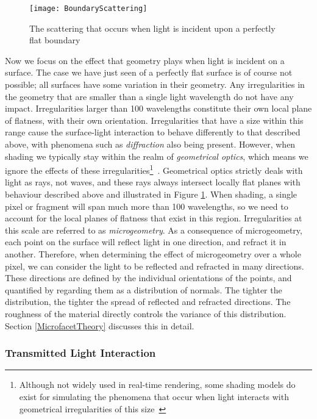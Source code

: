 \begin{figure}[h]
	\centering
	\texttt{[image: BoundaryScattering]}
	\caption{The scattering that occurs when light is incident upon a perfectly flat boundary}
	\label{fig:BoundaryScattering}
\end{figure}

Now we focus on the effect that geometry plays when light is incident on a surface. The case we have just seen of a perfectly flat surface is of course not possible; all surfaces have some variation in their geometry. Any irregularities in the geometry that are smaller than a single light wavelength do not have any impact. Irregularities larger than 100 wavelengths constitute their own local plane of flatness, with their own orientation. Irregularities that have a size within this range cause the surface-light interaction to behave differently to that described above, with phenomena such as \textit{diffraction} also being present. However, when shading we typically stay within the realm of \textit{geometrical optics}, which means we ignore the effects of these irregularities\footnote{Although not widely used in real-time rendering, some shading models do exist for simulating the phenomena that occur when light interacts with geometrical irregularities of this size~\cite{ReflectionAndDiffractionModel}}~\cite{DiffuseSpecularAtSurfaces}. Geometrical optics strictly deals with light as rays, not waves, and these rays always intersect locally flat planes with behaviour described above and illustrated in Figure \ref{fig:BoundaryScattering}. When shading, a single pixel or fragment will span much more than 100 wavelengths, so we need to account for the local planes of flatness that exist in this region. Irregularities at this scale are referred to as \textit{microgeometry}. As a consequence of microgeometry, each point on the surface will reflect light in one direction, and refract it in another. Therefore, when determining the effect of microgeometry over a whole pixel, we can consider the light to be reflected and refracted in many directions. These directions are defined by the individual orientations of the points, and quantified by regarding them as a distribution of normals. The tighter the distribution, the tighter the spread of reflected and refracted directions. The roughness of the material directly controls the variance of this distribution. Section \ref{MicrofacetTheory} discusses this in detail.

\subsubsection{Transmitted Light Interaction}


